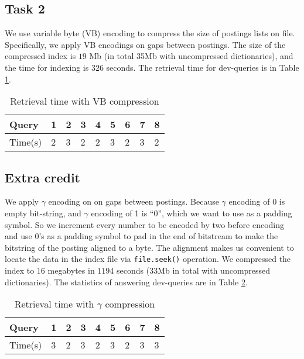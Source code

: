 \subsection{Task 2}
We use variable byte (VB) encoding to compress the size of postings lists on file.
Specifically, we apply VB encodings on gaps between postings.
The size of the compressed index is $19$ Mb (in total 35Mb with uncompressed dictionaries), and the time for indexing is $326$ seconds.
The retrieval time for dev-queries is in Table \ref{tab:2}.
\begin{table}[hb!]
\begin{center}
\begin{tabular}{|l|llllllll|}
  \hline
  Query & 1 & 2 & 3 & 4 & 5 & 6 & 7 & 8 \\
  \hline
  Time(s) & 2 & 3 & 2 & 2 & 3 & 2 & 3 & 2 \\
  \hline
\end{tabular}
\caption{Retrieval time with VB compression}\label{tab:2}
\end{center}
\end{table}

\subsection{Extra credit}
We apply $\gamma$ encoding on on gaps between postings. 
Because $\gamma$ encoding of 0 is empty bit-string, and $\gamma$ encoding of 1 is ``0'', which we want to use as a padding symbol. 
So we increment every number to be encoded by two before encoding and use $0$'s as a padding symbol to pad in the end of bitstream to make the bitstring of the posting aligned to a byte. 
The alignment makes us convenient to locate the data in the index file via \verb|file.seek()| operation. We compressed the index to $16$ megabytes in
$1194$ seconds (33Mb in total with uncompressed dictionaries). The statistics of answering dev-queries are in Table \ref{tab:3}.
\begin{table}[h!]
\begin{center}
\begin{tabular}{|l|llllllll|}
  \hline
  Query & 1 & 2 & 3 & 4 & 5 & 6 & 7 & 8 \\
  \hline
  Time(s) & 3 & 2 & 3 & 2 & 3 & 2 & 3 & 3 \\
  \hline
\end{tabular}
\caption{Retrieval time with $\gamma$ compression}\label{tab:3}
\end{center}
\end{table}

